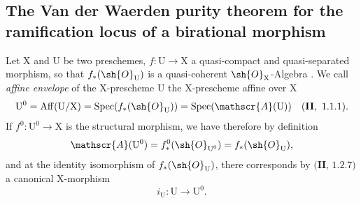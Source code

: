 \subsection{The Van der Waerden purity theorem for the ramification locus of a birational morphism}
\label{subsection:IV.21.12}

\begin{env}[21.12.1]
\label{IV.21.12.1}
Let $\mathrm{X}$ and $\mathrm{U}$ be two preschemes, $f:\mathrm{U}\to\mathrm{X}$ a quasi-compact and quasi-separated morphism, so that $f_*(\sh{O}_{\mathrm{U}})$ is a quasi-coherent $\sh{O}_{\mathrm{X}}$-Algebra .
We call \emph{affine envelope} of the $\mathrm{X}$-prescheme $\mathrm{U}$ the $\mathrm{X}$-prescheme affine over $\mathrm{X}$
\[
  \mathrm{U}^0=\operatorname{Aff}(\mathrm{U}/\mathrm{X})=\operatorname{Spec}(f_*(\sh{O}_{\mathrm{U}}))=\operatorname{Spec}(\mathscr{A}(\mathrm{U}))\quad(\mathbf{II},~1.1.1).
\]
If $f^0:\mathrm{U}^0\to\mathrm{X}$ is the structural morphism, we have therefore by definition
\[
  \mathscr{A}(\mathrm{U}^0)=f_*^0(\sh{O}_{\mathrm{U}^0})=f_*(\sh{O}_{\mathrm{U}}),
\]
and at the identity isomorphism of $f_*(\sh{O}_{\mathrm{U}})$, there corresponds by $(\mathbf{II}$, $1.2.7)$ a canonical $\mathrm{X}$-morphism
\[
\label{IV.21.12.1.1}
  i_{\mathrm{U}}:\mathrm{U}\to\mathrm{U}^0.
  \tag{21.12.1.1}
\]


\end{env}
